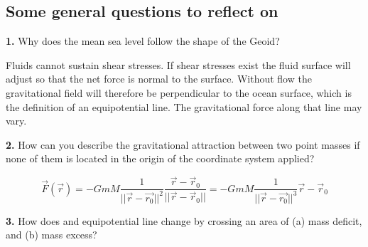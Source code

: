 \subsection{Some general questions to reflect on}
\textbf{1.} Why does the mean sea level follow the shape of the Geoid?\\

\ifanswers
  \begin{tcolorbox}[enhanced jigsaw,breakable,pad at break*=1mm,
    colback=blue!5!white,colframe=babyblueeyes,title=Solutions]
  Fluids cannot sustain shear stresses. If shear stresses exist the fluid surface will adjust so that the net force is normal to the surface. Without flow the gravitational field will therefore be perpendicular to the ocean surface, which is the definition of an equipotential line. The gravitational force along that line may vary.
  \end{tcolorbox}
\fi
\textbf{2.} How can you describe the gravitational attraction between two point masses if none of them is located in the origin of the coordinate system applied?\\

\ifanswers
  \begin{tcolorbox}[enhanced jigsaw,breakable,pad at break*=1mm,
    colback=blue!5!white,colframe=babyblueeyes,title=Solutions]
    $$
      \vec{F}(\vec{r}) = -GmM \frac{1}{||\vec{r}-\vec{r_0}||^2}\frac{\vec{r}-\vec{r}_0}{||\vec{r}-\vec{r}_0||}=-GmM \frac{1}{||\vec{r}-\vec{r_0}||^3}\vec{r}-\vec{r}_0
    $$
    \begin{center}
\end{center}
\end{tcolorbox}
\fi
\textbf{3.} How does and equipotential line change by crossing an area of (a) mass deficit, and (b) mass excess?\\

